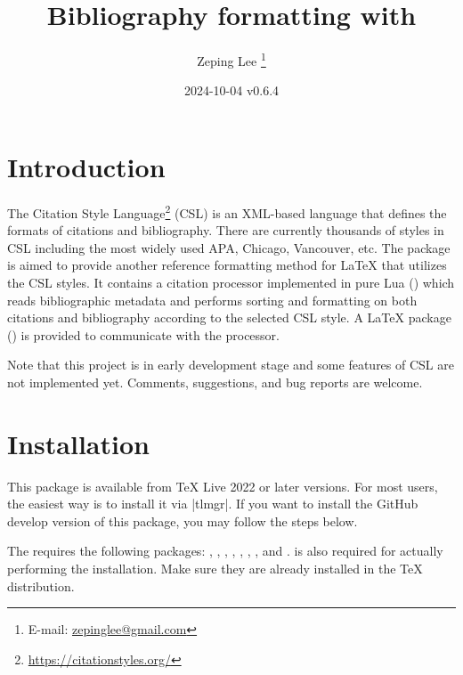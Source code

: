 \documentclass{l3doc}
\begin{document}
\title{%
  Bibliography formatting with 
}

\author{%
  Zeping Lee%
  \thanks{%
    E-mail:
    \href{mailto:zepinglee@gmail.com}
      {zepinglee@gmail.com}%
  }%
}

\date{2024-10-04 v0.6.4}

\maketitle


\begin{documentation}

\section{Introduction}

The Citation Style Language\footnote{\url{https://citationstyles.org/}} (CSL)
is an XML-based language that defines the formats of citations and bibliography.
There are currently thousands of styles in CSL including the most widely used
APA, Chicago, Vancouver, etc.
The  package is aimed to provide another reference formatting method
for LaTeX that utilizes the CSL styles.
It contains a citation processor implemented in pure Lua ()
which reads bibliographic metadata and performs sorting and formatting on both
citations and bibliography according to the selected CSL style.
A LaTeX package () is provided to communicate with the processor.

Note that this project is in early development stage and some features of CSL
are not implemented yet.
Comments, suggestions, and bug reports are welcome.


\section{Installation}

This package is available from TeX Live 2022 or later versions.
For most users, the easiest way is to install it via |tlmgr|.
If you want to install the GitHub develop version of this package,
you may follow the steps below.

The  requires the following packages:
, , , , ,
, , and .
 is also required for actually performing the installation.
Make sure they are already installed in the TeX distribution.


\end{documentation}
\end{document}
